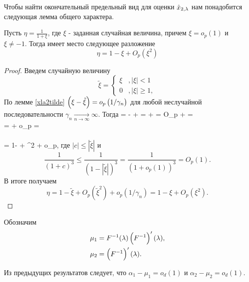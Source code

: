 \documentclass[a4paper,14pt,russian]{article}
\begin{document}
Чтобы найти окончательный предельный вид для оценки $\hat{x}_{2,\lambda}$  нам понадобится следующая лемма общего характера.
\begin{lemma}
  Пусть $\eta = \frac{1}{1+\xi}$, где $\xi$ - заданная случайная величина, причем $\xi = o_p(1)$ и $\xi \neq -1$.
  Тогда имеет место следующее разложение
  $$
  \eta = 1 - \xi + O_p(\xi^2)
  $$
  \label{xla2eta}
\end{lemma}
\begin{proof}
  Введем случайную величину
   $$
  \tilde{\xi} = \begin{cases}
    \xi &,  |\xi|<1  \\
    0 &, |\xi| \geq 1 ,
  \end{cases}
  $$
  По лемме \eqref{xla2tilde} $\left(\xi - \tilde{\xi}\right)= o_p\left(1/{\gamma_n}\right)$ для
    любой неслучайной последовательности $\gamma_n \xrightarrow[n \to \infty]{} \infty$.
  Тогда
 \ml
 {
  \eta =  -  +  =  +  = O_p \br{\tilde{\xi}-\xi}+ =\\ =  + o_p =\\
   \\
  = 1- \tilde{\xi} +  \tilde{\xi}^2 + o_p,
  }
  где $|c|\leq |\tilde{\xi}|$ и
  $$
  \frac{1}{(1+c)^3} \leq \frac{1}{(1-|\tilde{\xi}|)^3} =  \frac{1}{(1+o_p(1))^3} = O_p(1).
  $$
  В итоге получаем
$$
  \eta = 1 - \tilde{\xi} + O_p(\tilde{\xi}^2) + o_p(1/{\gamma_n})=1 - \xi + O_p(\xi^2).
$$
\end{proof}


Обозначим
\begin{align*}
\mu_1 &= F^{-1}(\lambda) \left(F^{-1}\right)'(\lambda),\\
\mu_2 &= \left(F^{-1}\right)'(\lambda).
\end{align*}

Из предыдущих результатов следует, что $\alpha_1 - \mu_1 = o_d(1)$ и $\alpha_2 - \mu_2 = o_d(1)$.
\end{document}
